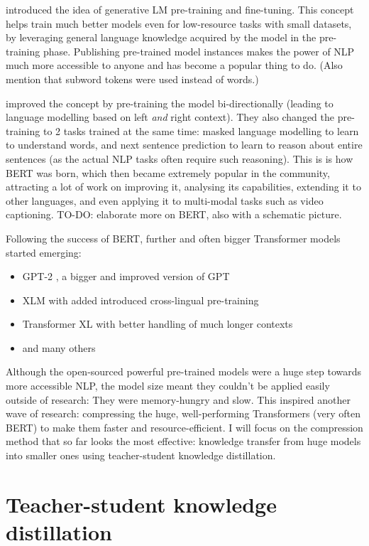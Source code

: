 \documentclass[bsc,frontabs,twoside,singlespacing,parskip,deptreport]{infthesis}
\begin{document}
{{    \citet{Radford_2018} introduced the idea of generative LM pre-training and fine-tuning. This concept helps train much better models even for low-resource tasks with small datasets, by leveraging general language knowledge acquired by the model in the pre-training phase. Publishing pre-trained model instances makes the power of NLP much more accessible to anyone and has become a popular thing to do. (Also mention that subword tokens were used instead of words.)
    
    \citet{Devlin_2018} improved the concept by pre-training the model bi-directionally (leading to language modelling based on left \textit{and} right context). They also changed the pre-training to 2 tasks trained at the same time: masked language modelling to learn to understand words, and next sentence prediction to learn to reason about entire sentences (as the actual NLP tasks often require such reasoning). This is is how BERT was born, which then became extremely popular in the community, attracting a lot of work on improving it, analysing its capabilities, extending it to other languages, and even applying it to multi-modal tasks such as video captioning. TO-DO: elaborate more on BERT, also with a schematic picture.
    
    Following the success of BERT, further and often bigger Transformer models started emerging:
    \begin{itemize}
      \item GPT-2 \citep{Radford_2019}, a bigger and improved version of GPT
      \item XLM \citep{Lample_2019} with added introduced cross-lingual pre-training
      \item Transformer XL \citep{Dai_2019} with better handling of much longer contexts
      \item and many others
    \end{itemize}

    Although the open-sourced powerful pre-trained models were a huge step towards more accessible NLP, the model size meant they couldn't be applied easily outside of research: They were memory-hungry and slow. 
    This inspired another wave of research: compressing the huge, well-performing Transformers (very often BERT) to make them faster and resource-efficient. 
    I will focus on the compression method that so far looks the most effective: knowledge transfer from huge models into smaller ones using teacher-student knowledge distillation.
  }

  \section{Teacher-student knowledge distillation}{
}}
\end{document}
